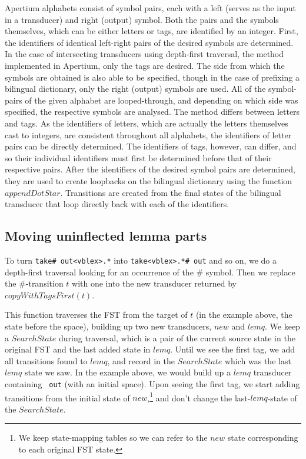 \documentclass[10pt, a4paper]{article}
\newcommand{\ana}[1]{\texttt{#1}}
\begin{document}
Apertium alphabets consist of symbol pairs, each with a left (serves
as the input in a transducer) and right (output) symbol. Both the
pairs and the symbols themselves, which can be either letters or tags,
are identified by an integer. First, the identifiers of identical
left-right pairs of the desired symbols are determined. In the case of
intersecting transducers using depth-first traversal, the method
implemented in Apertium, only the tags are desired. The side from
which the symbols are obtained is also able to be specified, though in
the case of prefixing a bilingual dictionary, only the right (output)
symbols are used. All of the symbol-pairs of the given alphabet are
looped-through, and depending on which side was specified, the
respective symbols are analysed. The method differs between letters
and tags. As the identifiers of letters, which are actually the
letters themselves cast to integers, are consistent throughout all
alphabets, the identifiers of letter pairs can be directly determined.
The identifiers of tags, however, can differ, and so their individual
identifiers must first be determined before that of their respective
pairs. After the identifiers of the desired symbol pairs are
determined, they are used to create loopbacks on the bilingual
dictionary using the function $appendDotStar$. Transitions are created
from the final states of the bilingual transducer that loop directly
back with each of the identifiers.

\subsection{Moving uninflected lemma parts}
\label{sec:lemqmove}

To turn \ana{take\# out<vblex>.*} into \ana{take<vblex>.*\# out} and
so on, we do a depth-first traversal looking for an occurrence of the
\# symbol. Then we replace the \#-transition $t$ with one into the new
transducer returned by $copyWithTagsFirst(t)$. 

This function traverses the FST from the target of $t$ (in the example
above, the state before the space), building up two new transducers,
$new$ and $lemq$. We keep a $SearchState$ during traversal, which is a
pair of the current source state in the original FST and the last
added state in $lemq$. Until we see the first tag, we add all
transitions found to $lemq$, and record in the $SearchState$ which was
the last $lemq$ state we saw. In the example above, we would build up
a $lemq$ transducer containing \ana{ out} (with an initial space).
Upon seeing the first tag, we start adding transitions from the
initial state of $new$,\footnote{We keep state-mapping tables so we
can refer to the $new$ state corresponding to each original FST
state.} and don't change the last-$lemq$-state of the $SearchState$.
\end{document}
